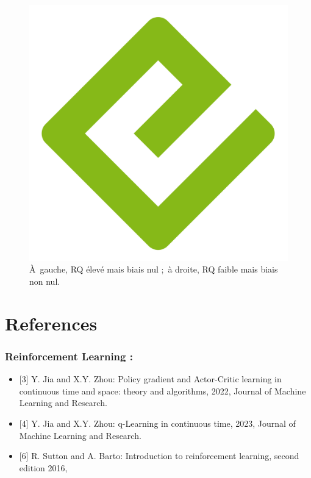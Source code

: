 \documentclass[
  10,
  letterpaper,
  DIV=11,
  numbers=noendperiod]{scrreport}
\newlength{\cslhangindent}
\newenvironment{CSLReferences}[2] %
 {\begin{list}{}{%
  \setlength{\itemindent}{0pt}
  \setlength{\leftmargin}{0pt}
  \setlength{\parsep}{0pt}
  \ifodd #1
   \setlength{\leftmargin}{\cslhangindent}
   \setlength{\itemindent}{-1\cslhangindent}
  \fi
  \setlength{\itemsep}{#2\baselineskip}}}
 {\end{list}}
\theoremstyle{definition}
\theoremstyle{remark}
\begin{document}
\begin{figure}[H]

{\centering \includegraphics[width=0.5\linewidth,height=\textheight,keepaspectratio]{images/cover.png}

}

\caption{À~gauche, RQ élevé mais biais nul ;~à droite, RQ faible mais
biais non nul.}

\end{figure}%

\chapter{}\label{section-2}


\chapter*{References}\label{references}


\label{refs}
\begin{CSLReferences}{0}{1}
\end{CSLReferences}

\subsection*{Reinforcement Learning :}\label{reinforcement-learning}

\begin{itemize}
\item
  {[}3{]} Y. Jia and X.Y. Zhou: Policy gradient and Actor-Critic
  learning in continuous time and space: theory and algorithms, 2022,
  Journal of Machine Learning and Research.
\item
  {[}4{]} Y. Jia and X.Y. Zhou: q-Learning in continuous time, 2023,
  Journal of Machine Learning and Research.
\item
  {[}6{]} R. Sutton and A. Barto: Introduction to reinforcement
  learning, second edition 2016,
\end{itemize}
\end{document}
